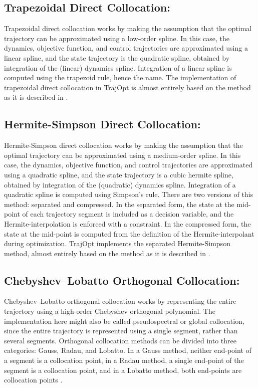 \subsection{Trapezoidal Direct Collocation:  }

Trapezoidal direct collocation works by making the assumption that the optimal trajectory can be approximated using a low-order spline. In this case, the dynamics, objective function, and control trajectories are approximated using a linear spline, and the state trajectory is the quadratic spline, obtained by integration of the (linear) dynamics spline. Integration of a linear spline is computed using the trapezoid rule, hence the name. The implementation of trapezoidal direct collocation in TrajOpt is almost entirely based on the method as it is described in \cite{Betts2010}.

\subsection{Hermite-Simpson Direct Collocation:  }

Hermite-Simpson direct collocation works by making the assumption that the optimal trajectory can be approximated using a medium-order spline. In this case, the dynamics, objective function, and control trajectories are approximated using a quadratic spline, and the state trajectory is a cubic hermite spline, obtained by integration of the (quadratic) dynamics spline. Integration of a quadratic spline is computed using Simpson's rule. There are two versions of this method: separated and compressed. In the separated form, the state at the mid-point of each trajectory segment is included as a decision variable, and the Hermite-interpolation is enforced with a constraint. In the compressed form, the state at the mid-point is computed from the definition of the Hermite-interpolant during optimization. TrajOpt implements the separated Hermite-Simpson method, almost entirely based on the method as it is described in \cite{Betts2010}.

\subsection{Chebyshev--Lobatto Orthogonal Collocation:  }

Chebyshev--Lobatto orthogonal collocation works by representing the entire trajectory using a high-order Chebyshev orthogonal polynomial. The implementation here might also be called pseudospectral or global collocation, since the entire trajectory is represented using a single segment, rather than several segments. Orthogonal collocation methods can be divided into three categories: Gauss, Radau, and Lobatto. In a Gauss method, neither end-point of a segment is a collocation point, in a Radau method, a single end-point of the segment is a collocation point, and in a Lobatto method, both end-points are collocation points \cite{Garg2010}.

